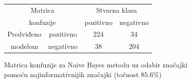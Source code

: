 \documentclass[conference]{IEEEtran}
\begin{document}
\begin{figure}[!ht]
\begin{minipage}{0.5\textwidth}
\centering
\begin{tabular}{|c|c|c|c|}
  \hline
  \multicolumn{2}{|c|}{Matrica}  & \multicolumn{2}{|c|}{Stvarna klasa} \\ 
  \cline{3-4}
  \multicolumn{2}{|c|}{konfuzije} & pozitivno & negativno \\ 
  \hline
  Predviđeno & pozitivno & 224 & 34 \\
  \cline{2-4}
  modelom & negativno & 38 & 204 \\
  \hline
\end{tabular}
\caption{Matrica konfuzije za Naive Bayes metodu uz odabir značajki pomoću najinformativnijih značajki (točnost $85.6\%$)}
\end{minipage}
\end{figure}
\end{document}
